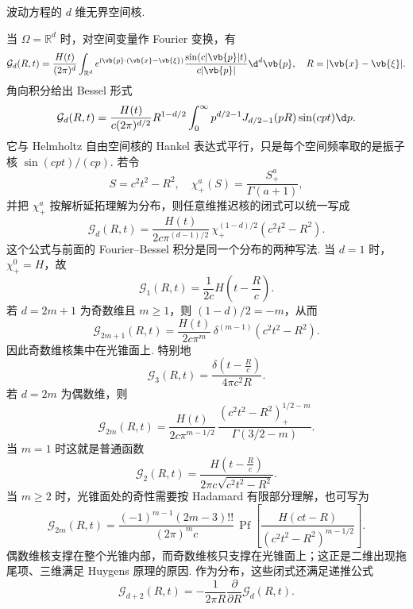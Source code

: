 \begin{example}
	波动方程的 \(d\) 维无界空间核.
	
	当 \(\Omega=\mathbb{R}^d\) 时，对空间变量作 Fourier 变换，有
	\begin{equation*}
		\mathcal{G}_d(R,t)
		=\frac{H(t)}{(2\pi)^d}\int_{\mathbb{R}^d}
		e^{\mathrm{i}\vb{p}\cdot(\vb{x}-\vb{\xi})}
		\frac{\sin(c|\vb{p}|t)}{c|\vb{p}|}\d^d\vb{p},
		\quad R=|\vb{x}-\vb{\xi}|.
	\end{equation*}
	角向积分给出 Bessel 形式
	\begin{equation*}
		\mathcal{G}_d(R,t)
		=\frac{H(t)}{c(2\pi)^{d/2}}R^{1-d/2}
		\int_0^\infty p^{d/2-1}J_{d/2-1}(pR)\sin(cpt)\d p.
	\end{equation*}
	它与 Helmholtz 自由空间核的 Hankel 表达式平行，只是每个空间频率取的是振子核 \(\sin(cpt)/(cp)\). 若令
\begin{equation*}
		S=c^2t^2-R^2,
		\quad
		\chi_+^a(S)=\frac{S_+^a}{\Gamma(a+1)},
\end{equation*}
	并把 \(\chi_+^a\) 按解析延拓理解为分布，则任意维推迟核的闭式可以统一写成
\begin{equation*}
		\mathcal{G}_d(R,t)
		=\frac{H(t)}{2c\pi^{(d-1)/2}}\,
		\chi_+^{(1-d)/2}\left(c^2t^2-R^2\right).
\end{equation*}
	这个公式与前面的 Fourier--Bessel 积分是同一个分布的两种写法. 当 \(d=1\) 时，\(\chi_+^0=H\)，故
\begin{equation*}
		\mathcal{G}_1(R,t)=\frac{1}{2c}H\left(t-\frac{R}{c}\right).
\end{equation*}
	若 \(d=2m+1\) 为奇数维且 \(m\geq1\)，则 \((1-d)/2=-m\)，从而
\begin{equation*}
		\mathcal{G}_{2m+1}(R,t)
		=\frac{H(t)}{2c\pi^m}\,
		\delta^{(m-1)}\left(c^2t^2-R^2\right).
\end{equation*}
	因此奇数维核集中在光锥面上. 特别地
\begin{equation*}
		\mathcal{G}_3(R,t)=\frac{\delta\left(t-\frac{R}{c}\right)}{4\pi c^2R}.
\end{equation*}
	若 \(d=2m\) 为偶数维，则
\begin{equation*}
		\mathcal{G}_{2m}(R,t)
		=\frac{H(t)}{2c\pi^{m-1/2}}\,
		\frac{\left(c^2t^2-R^2\right)_+^{1/2-m}}{\Gamma(3/2-m)}.
\end{equation*}
	当 \(m=1\) 时这就是普通函数
\begin{equation*}
		\mathcal{G}_2(R,t)=\frac{H\left(t-\frac{R}{c}\right)}{2\pi c\sqrt{c^2t^2-R^2}}.
\end{equation*}
	当 \(m\geq2\) 时，光锥面处的奇性需要按 Hadamard 有限部分理解，也可写为
\begin{equation*}
		\mathcal{G}_{2m}(R,t)
		=\frac{(-1)^{m-1}(2m-3)!!}{(2\pi)^m c}\,
		\operatorname{Pf}\left[
		\frac{H(ct-R)}{\left(c^2t^2-R^2\right)^{m-1/2}}
		\right].
\end{equation*}
	偶数维核支撑在整个光锥内部，而奇数维核只支撑在光锥面上；这正是二维出现拖尾项、三维满足 Huygens 原理的原因. 作为分布，这些闭式还满足递推公式
\begin{equation*}
		\mathcal{G}_{d+2}(R,t)=-\frac{1}{2\pi R}\frac{\partial}{\partial R}\mathcal{G}_d(R,t).
\end{equation*}
\end{example}

